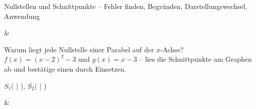 \begin{aufgabe}{Nullstellen und Schnittpunkte – Fehler finden, Begründen, Darstellungswechsel, Anwendung}
\begin{gleichungsraster}[2]
 &
\end{gleichungsraster}
\begin{teile}
\teil Warum liegt jede Nullstelle einer Parabel auf der $x$-Achse?
\teil $f(x) = (x - 2)^2 - 3$ und $g(x) = x - 3$ – lies die Schnittpunkte am Graphen ab und bestätige einen durch Einsetzen.

\begin{ksys}[xmin=-1,xmax=5,ymin=-4,ymax=2,ablesen]
\end{ksys}
$S_1($ \leerfeld | \leerfeld ), $S_2($ \leerfeld | \leerfeld )
\end{teile}
\begin{gleichungsraster}[2]
 & \\
\end{gleichungsraster}
\end{aufgabe}
